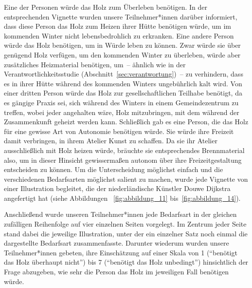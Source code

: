 \documentclass[justified,nobib,symmetric,twoside]{tufte-handout}
\begin{document}
Eine der Personen würde das Holz zum Überleben benötigen.
In der entsprechenden Vignette wurden unsere Teilnehmer*innen darüber informiert, dass diese Person das Holz zum Heizen ihrer Hütte benötigen würde, um im kommenden Winter nicht lebensbedrohlich zu erkranken.
Eine andere Person würde das Holz benötigen, um in Würde leben zu können.
Zwar würde sie über genügend Holz verfügen, um den kommenden Winter zu überleben, würde aber zusätzliches Heizmaterial benötigen, um~-- ähnlich wie in der Verantwortlichkeitsstudie (Abschnitt~\ref{sec:verantwortung})~-- zu verhindern, dass es in ihrer Hütte während des kommenden Winters ungebührlich kalt wird.
Von einer dritten Person würde das Holz zur gesellschaftlichen Teilhabe benötigt, da es gängige Praxis sei, sich während des Winters in einem Gemeindezentrum zu treffen, wobei jeder angehalten wäre, Holz mitzubringen, mit dem während der Zusammenkunft geheizt werden kann.
Schließlich gab es eine Person, die das Holz für eine gewisse Art von Autonomie benötigen würde.
Sie würde ihre Freizeit damit verbringen, in ihrem Atelier Kunst zu schaffen.
Da sie ihr Atelier ausschließlich mit Holz heizen würde, bräuchte sie entsprechendes Brennmaterial also, um in dieser Hinsicht gewissermaßen autonom über ihre Freizeitgestaltung entscheiden zu können.
Um die Unterscheidung möglichst einfach und die verschiedenen Bedarfsarten möglichst salient zu machen, wurde jede Vignette von einer Illustration begleitet, die der niederländische Künstler Douwe Dijkstra angefertigt hat (siehe Abbildungen ~\ref{fig:abbildung_11} bis~\ref{fig:abbildung_14}).

Anschließend wurde unseren Teilnehmer*innen jede Bedarfsart in der gleichen zufälligen Reihenfolge auf vier einzelnen Seiten vorgelegt.
Im Zentrum jeder Seite stand dabei die jeweilige Illustration, unter der ein einzelner Satz noch einmal die dargestellte Bedarfsart zusammenfasste.
Darunter wiederum wurden unsere Teilnehmer*innen gebeten, ihre Einschätzung auf einer Skala von 1 (\enquote{benötigt das Holz überhaupt nicht}) bis 7 (\enquote{benötigt das Holz unbedingt}) hinsichtlich der Frage abzugeben, wie sehr die Person das Holz im jeweiligen Fall benötigen würde.
\end{document}
